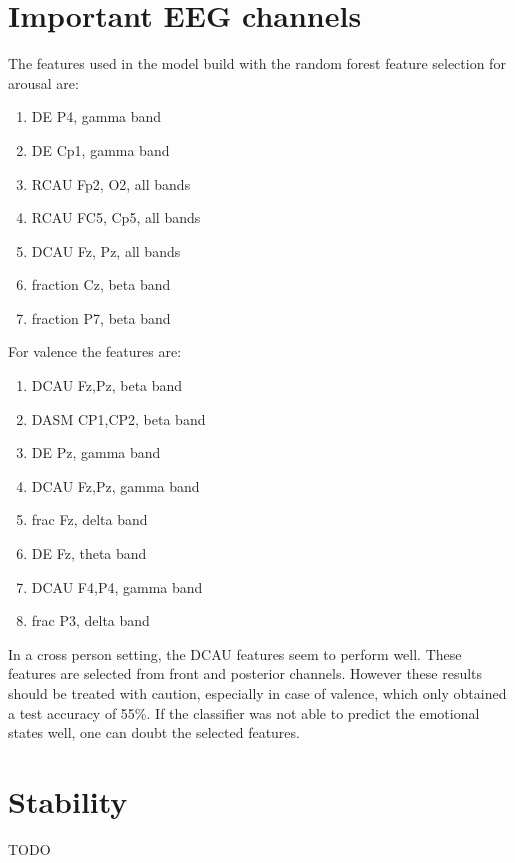 \section{Important EEG channels}

The features used in the model build with the random forest feature selection for arousal are:
\begin{enumerate}
\item DE P4, gamma band
\item DE Cp1, gamma band
\item RCAU Fp2, O2, all bands
\item RCAU FC5, Cp5, all bands
\item DCAU Fz, Pz, all bands
\item fraction Cz, beta band
\item fraction P7, beta band
\end{enumerate}

For valence the features are:
\begin{enumerate}
\item DCAU Fz,Pz, beta band
\item DASM CP1,CP2, beta band
\item DE Pz, gamma band
\item DCAU Fz,Pz, gamma band
\item frac Fz, delta band
\item DE Fz, theta band
\item DCAU F4,P4, gamma band
\item frac P3, delta band
\end{enumerate}

In a cross person setting, the DCAU features seem to perform well. These features are selected from front and posterior channels. However these results should be treated with caution, especially in case of valence, which only obtained a test accuracy of 55\%. If the classifier was not able to predict the emotional states well, one can doubt the selected features. 

\section{Stability}
TODO
